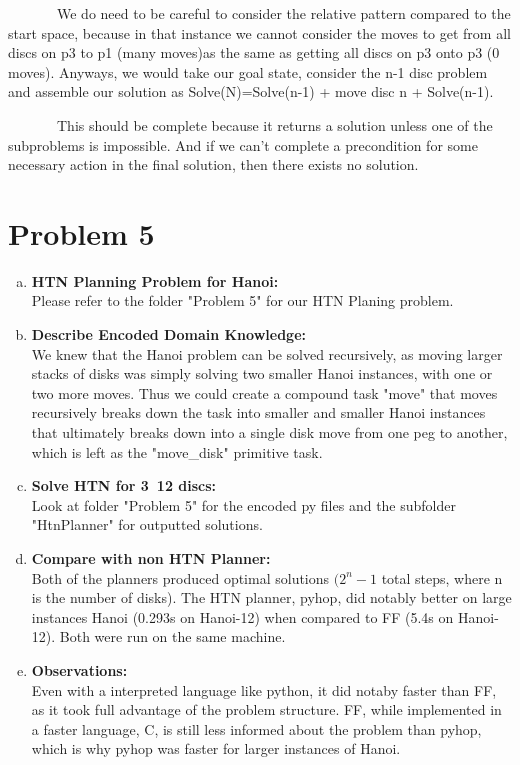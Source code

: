 \documentclass[]{article}
\begin{document}
\begin{enumerate}[(a)]
		~~~~~~~We do need to be careful to consider the relative pattern compared to the start space, because in that instance we cannot consider the moves to get from all discs on p3  to p1 (many moves)as the same as getting all discs on p3 onto p3 (0 moves). Anyways, we would take our goal state, consider the n-1 disc problem and assemble our solution as Solve(N)=Solve(n-1) + move disc n + Solve(n-1). 
		
		~~~~~~~This should be complete because it returns a solution unless one of the subproblems is impossible. And if we can't complete a precondition for some necessary action in the final solution, then there exists no solution.	
	\end{enumerate}
	
\section{Problem 5}
	\begin{enumerate}[(a)]
		\item \textbf{HTN Planning Problem for Hanoi:}\\
		Please refer to the folder "Problem 5" for our HTN Planing problem.\\

		   
		\item \textbf{Describe Encoded Domain Knowledge:}\\
		We knew that the Hanoi problem can be solved recursively, as moving larger stacks of disks was simply solving two smaller Hanoi instances,
		     with one or two more moves. Thus we could create a compound task "move" that moves recursively breaks down the task into smaller and smaller Hanoi instances that ultimately breaks down into a single disk move from one peg to another, which is left as the "move\_disk" primitive task.	\\	
		   
		\item \textbf{Solve HTN for 3~12 discs:}\\
		Look at folder "Problem 5" for the encoded py files and the subfolder "HtnPlanner" for outputted solutions.\\
	
				      
		\item \textbf{Compare with non HTN Planner:}\\
			Both of the planners produced optimal solutions \((2^n -1\) total steps, where n is the number of disks). The HTN planner, pyhop, did notably better on large instances Hanoi (0.293s on Hanoi-12) when compared to FF (5.4s on Hanoi-12). Both were run on the same machine.\\

		\item \textbf{Observations:}\\
				Even with a interpreted language like python, it did notaby faster than FF, as it took full advantage of the problem structure. FF, while implemented in a faster language, C, is still less informed about the problem than pyhop, which is why pyhop was faster for larger instances of Hanoi.\\
				      
	\end{enumerate}
\end{document}
